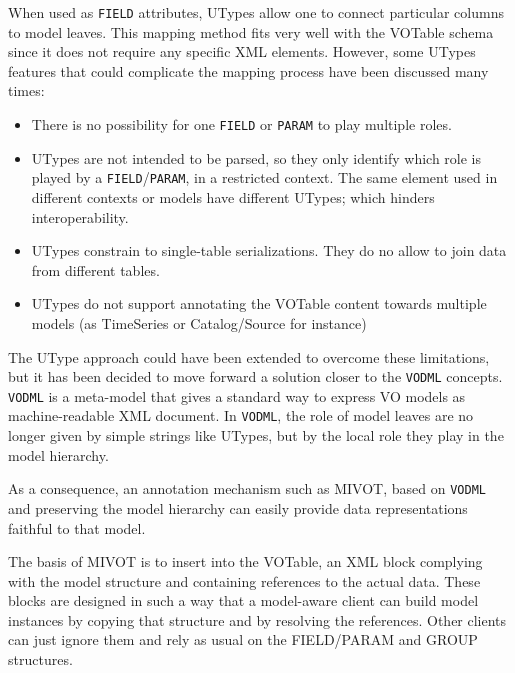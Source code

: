 When used as \texttt{FIELD} attributes, UTypes allow one to connect particular columns to model leaves. This mapping method fits very well with the VOTable schema since it does not require any specific XML elements. 
However, some UTypes features that could complicate the mapping process have been discussed many times:

\begin{itemize}
  \item There is no possibility for one  \texttt{FIELD} or \texttt{PARAM} to play multiple roles.
  \item UTypes are not intended to be parsed, so they only identify which role is played by a \texttt{FIELD}/\texttt{PARAM}, in a restricted context. The same element used in different contexts or models have different UTypes; which hinders interoperability.
  \item UTypes constrain to single-table serializations. They do no allow to join data from different tables. 
  \item UTypes do not support annotating the VOTable content towards multiple models 
  (as TimeSeries or Catalog/Source for instance)
\end{itemize}

The UType approach could have been extended to overcome these limitations, but it has been decided to move forward a solution closer to the \texttt{VODML} \citep{2018ivoa.spec.0910L} concepts. 
\texttt{VODML} is a meta-model that gives a standard way to express VO models as machine-readable XML document.
In \texttt{VODML}, the role of model leaves are no longer given by simple strings like UTypes, but by the local role they play in the model hierarchy.




As a consequence, an annotation mechanism such as MIVOT, based on \texttt{VODML} and preserving the model hierarchy can easily provide data representations faithful to that model.

The basis of MIVOT is to insert into the VOTable, an XML block complying with the 
model structure and containing references to the actual data.
These blocks are designed in such a way that a model-aware client can build  model instances by copying that structure and by resolving the references. 
Other clients can just ignore them and rely as usual on the FIELD/PARAM and GROUP structures.


